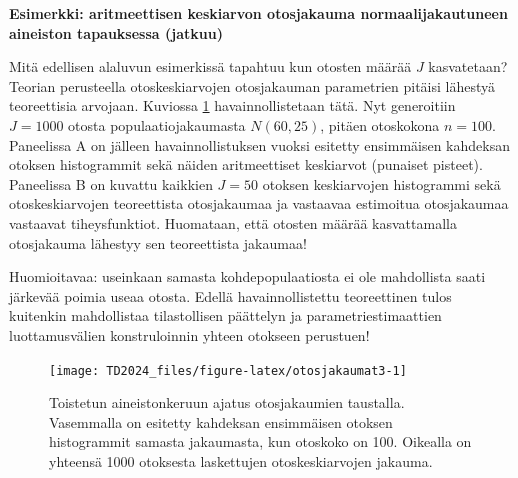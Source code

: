 \documentclass[
]{book}
\begin{document}
\begin{eblock}{}
\textbf{Esimerkki: aritmeettisen keskiarvon otosjakauma normaalijakautuneen aineiston tapauksessa (jatkuu)}

Mitä edellisen alaluvun esimerkissä tapahtuu kun otosten määrää \(J\) kasvatetaan? Teorian perusteella otoskeskiarvojen otosjakauman parametrien pitäisi lähestyä teoreettisia arvojaan. Kuviossa \ref{fig:otosjakaumat3} havainnollistetaan tätä. Nyt generoitiin \(J=1000\) otosta populaatiojakaumasta \(N(60,25)\), pitäen otoskokona \(n=100\). Paneelissa A on jälleen havainnollistuksen vuoksi esitetty ensimmäisen kahdeksan otoksen histogrammit sekä näiden aritmeettiset keskiarvot (punaiset pisteet). Paneelissa B on kuvattu kaikkien \(J=50\) otoksen keskiarvojen histogrammi sekä otoskeskiarvojen teoreettista otosjakaumaa ja vastaavaa estimoitua otosjakaumaa vastaavat tiheysfunktiot. Huomataan, että otosten määrää kasvattamalla otosjakauma lähestyy sen teoreettista jakaumaa!

Huomioitavaa: useinkaan samasta kohdepopulaatiosta ei ole mahdollista saati järkevää poimia useaa otosta. Edellä havainnollistettu teoreettinen tulos kuitenkin mahdollistaa tilastollisen päättelyn ja parametriestimaattien luottamusvälien konstruloinnin yhteen otokseen perustuen!

\end{eblock}

\begin{figure}

{\centering \texttt{[image: TD2024\_files/figure-latex/otosjakaumat3-1]} 

}

\caption{Toistetun aineistonkeruun ajatus otosjakaumien taustalla. Vasemmalla on esitetty kahdeksan ensimmäisen otoksen histogrammit samasta jakaumasta, kun otoskoko on 100. Oikealla on yhteensä 1000 otoksesta laskettujen otoskeskiarvojen jakauma.}\label{fig:otosjakaumat3}
\end{figure}
\end{document}
